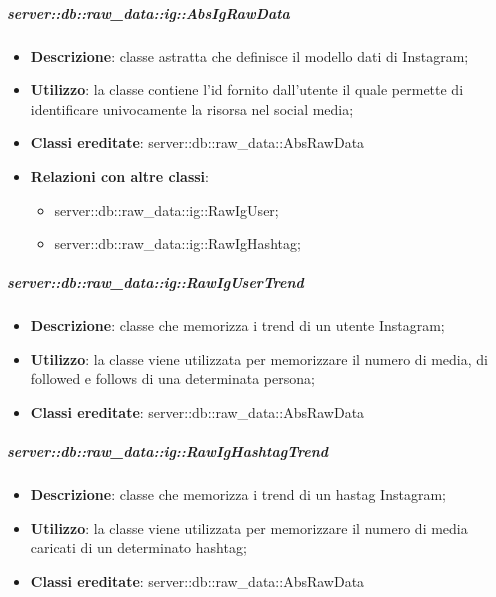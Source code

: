 		\subparagraph{server::db::raw\_data::ig::AbsIgRawData} %
		\label{subp:server_db_raw_data_ig_absigrawdata}
			\begin{itemize}
				\item \textbf{Descrizione}: classe astratta che definisce il modello dati di Instagram;
				\item \textbf{Utilizzo}: la classe contiene l'id fornito dall'utente il quale permette di identificare univocamente la risorsa nel social media;
				\item \textbf{Classi ereditate}: server::db::raw\_data::AbsRawData
				\item \textbf{Relazioni con altre classi}:
					\begin{itemize}
						\item server::db::raw\_data::ig::RawIgUser;
						\item server::db::raw\_data::ig::RawIgHashtag;
					\end{itemize}
			\end{itemize}


		\subparagraph{server::db::raw\_data::ig::RawIgUserTrend} %
		\label{subp:server_db_raw_data_ig_rawigusertrend}
			\begin{itemize}
				\item \textbf{Descrizione}: classe che memorizza i trend di un utente Instagram;
				\item \textbf{Utilizzo}: la classe viene utilizzata per memorizzare il numero di media, di followed e follows di una determinata persona;
				\item \textbf{Classi ereditate}: server::db::raw\_data::AbsRawData
			\end{itemize}


		\subparagraph{server::db::raw\_data::ig::RawIgHashtagTrend} %
		\label{subp:server_db_raw_data_ig_rawighashtagtrend}
			\begin{itemize}
				\item \textbf{Descrizione}: classe che memorizza i trend di un hastag Instagram;
				\item \textbf{Utilizzo}: la classe viene utilizzata per memorizzare il numero di media caricati di un determinato hashtag;
				\item \textbf{Classi ereditate}: server::db::raw\_data::AbsRawData
			\end{itemize}



